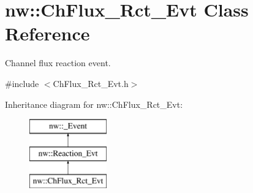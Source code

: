 \hypertarget{classnw_1_1_ch_flux___rct___evt}{\section{nw\+:\+:Ch\+Flux\+\_\+\+Rct\+\_\+\+Evt Class Reference}
\label{classnw_1_1_ch_flux___rct___evt}
}


Channel flux reaction event.  




{\ttfamily \#include $<$Ch\+Flux\+\_\+\+Rct\+\_\+\+Evt.\+h$>$}

Inheritance diagram for nw\+:\+:Ch\+Flux\+\_\+\+Rct\+\_\+\+Evt\+:\begin{figure}[H]
\begin{center}
\leavevmode
\includegraphics[height=3.000000cm]{de/d56/classnw_1_1_ch_flux___rct___evt}
\end{center}
\end{figure}
